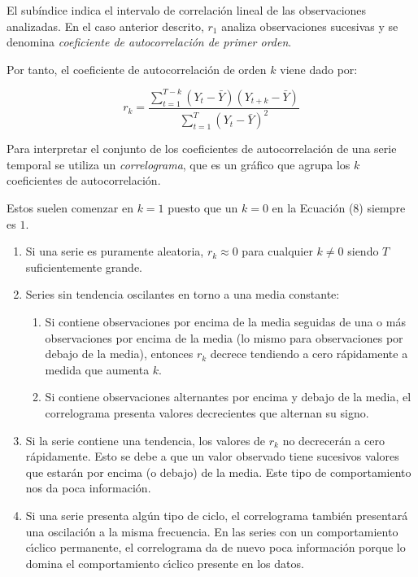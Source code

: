 \documentclass[a4paper,10pt]{article}
\begin{document}
El subíndice indica el intervalo de correlación lineal de las observaciones analizadas. En el caso anterior descrito, $r_1$ analiza observaciones sucesivas y se denomina \textit{coeficiente de autocorrelación de primer orden}.

Por tanto, el coeficiente de autocorrelación de orden $k$ viene dado por:

\begin{equation}
 r_k = \frac{\sum_{t=1}^{T-k} (Y_t - \bar{Y}) (Y_{t+k} - \bar{Y})}
 {\sum_{t=1}^{T} (Y_t - \bar{Y})^2 }
\end{equation}

Para interpretar el conjunto de los coeficientes de autocorrelación de una serie temporal se utiliza un \textit{correlograma}, que es un gráfico que agrupa los $k$ coeficientes de autocorrelación.

Estos suelen comenzar en $k=1$ puesto que un $k=0$ en la Ecuación (8) siempre es $1$.

\begin{enumerate}
 \item Si una serie es puramente aleatoria, $r_k \approx 0$ para cualquier $k \neq 0$ siendo $T$ suficientemente grande.

 \item Series sin tendencia oscilantes en torno a una media constante:

 \begin{enumerate}
  \item Si contiene observaciones por encima de la media seguidas de una o más observaciones por encima de la media (lo mismo para observaciones por debajo de la media), entonces $r_k$ decrece tendiendo a cero rápidamente a medida que aumenta $k$.

  \item Si contiene observaciones alternantes por encima y debajo de la media, el correlograma presenta valores decrecientes que alternan su signo.
 \end{enumerate}

 \item Si la serie contiene una tendencia, los valores de $r_k$ no decrecerán a cero rápidamente. Esto se debe a que un valor observado tiene sucesivos valores que estarán por encima (o debajo) de la media. Este tipo de comportamiento nos da poca información.

 \item Si una serie presenta algún tipo de ciclo, el correlograma también presentará una oscilación
a la misma frecuencia. En las series con un comportamiento cı́clico permanente, el correlograma da
de nuevo poca información porque lo domina el comportamiento cı́clico presente en los datos.
\end{enumerate}
\end{document}

